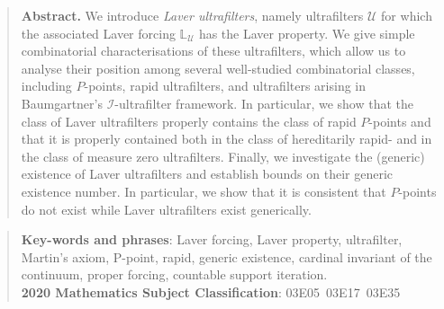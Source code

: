 \documentclass[12pt]{article}
\theoremstyle{definition}
\begin{document}
\begin{quote}
{\small {\bf Abstract.} We introduce \emph{Laver ultrafilters}, namely ultrafilters $\mathcal{U}$ for which the associated Laver forcing $\mathbb{L}_{\mathcal{U}}$ has the Laver property. We give simple combinatorial characterisations of these ultrafilters, which allow us to analyse their position among several well-studied combinatorial classes, including $P$-points, rapid ultrafilters, and ultrafilters arising in Baumgartner’s $\mathcal{I}$-ultrafilter framework. In particular, we show that the class of Laver ultrafilters properly contains the class of rapid $P$-points and that it is properly contained both in the class of hereditarily rapid- and in the class of measure zero ultrafilters. Finally, we investigate the (generic) existence of Laver ultrafilters and establish bounds on their generic existence number. In particular, we show that it is consistent that $P$-points do not exist while Laver ultrafilters exist generically.

}
\end{quote}

\begin{quote}
\small{{\bf Key-words and phrases\/}: Laver forcing, Laver property, ultrafilter, Martin's axiom, P-point, rapid, generic existence, cardinal invariant of the continuum, proper forcing, countable support iteration.}\\
\small{\bf 2020 Mathematics Subject Classification\/}: { 03E05}\ {03E17}\ {03E35}
\end{quote}
\end{document}
